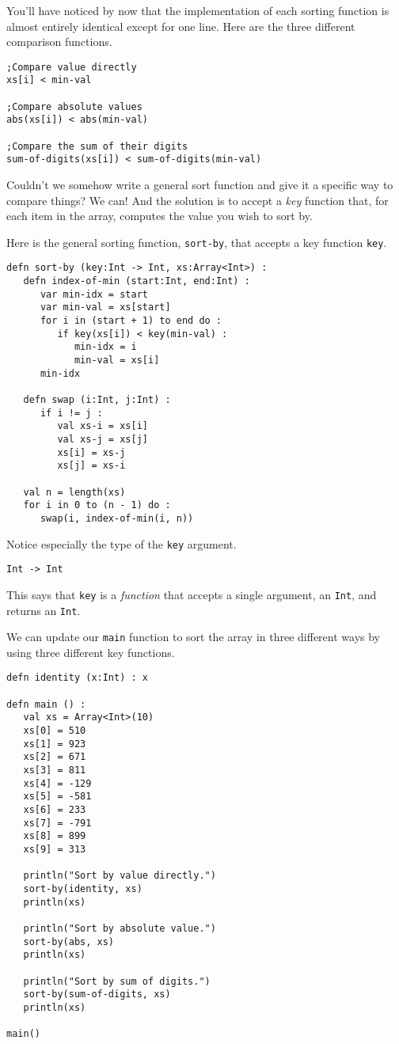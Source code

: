 \documentclass[10pt,oneside]{book}
\begin{document}
You'll have noticed by now that the implementation of each sorting function is almost entirely identical except for one line. Here are the three different comparison functions.
\begin{lstlisting}
;Compare value directly
xs[i] < min-val

;Compare absolute values
abs(xs[i]) < abs(min-val)

;Compare the sum of their digits
sum-of-digits(xs[i]) < sum-of-digits(min-val)
\end{lstlisting}
Couldn't we somehow write a general sort function and give it a specific way to compare things? We can! And the solution is to accept a {\em key} function that, for each item in the array, computes the value you wish to sort by.

Here is the general sorting function, \texttt{\frenchspacing sort-by}, that accepts a key function \texttt{\frenchspacing key}.
\begin{lstlisting}
defn sort-by (key:Int -> Int, xs:Array<Int>) :
   defn index-of-min (start:Int, end:Int) :
      var min-idx = start
      var min-val = xs[start]
      for i in (start + 1) to end do :
         if key(xs[i]) < key(min-val) :
            min-idx = i
            min-val = xs[i]
      min-idx

   defn swap (i:Int, j:Int) :
      if i != j :
         val xs-i = xs[i]
         val xs-j = xs[j]
         xs[i] = xs-j
         xs[j] = xs-i
   
   val n = length(xs)
   for i in 0 to (n - 1) do :
      swap(i, index-of-min(i, n))
\end{lstlisting}
Notice especially the type of the \texttt{\frenchspacing key} argument.
\begin{lstlisting}
Int -> Int
\end{lstlisting}
This says that \texttt{\frenchspacing key} is a {\em function} that accepts a single argument, an \texttt{\frenchspacing Int}, and returns an \texttt{\frenchspacing Int}.

We can update our \texttt{\frenchspacing main} function to sort the array in three different ways by using three different key functions.
\begin{lstlisting}
defn identity (x:Int) : x
   
defn main () :
   val xs = Array<Int>(10)
   xs[0] = 510
   xs[1] = 923
   xs[2] = 671
   xs[3] = 811
   xs[4] = -129
   xs[5] = -581
   xs[6] = 233
   xs[7] = -791
   xs[8] = 899
   xs[9] = 313

   println("Sort by value directly.")
   sort-by(identity, xs)
   println(xs)

   println("Sort by absolute value.")
   sort-by(abs, xs)
   println(xs)

   println("Sort by sum of digits.")
   sort-by(sum-of-digits, xs)
   println(xs)
   
main()
\end{lstlisting}
\end{document}

